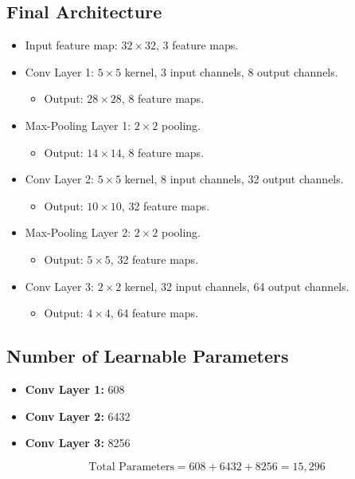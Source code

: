 \documentclass[a4paper,12pt]{article}
\begin{document}
\subsection*{Final Architecture}
\begin{itemize}
    \item Input feature map: \( 32 \times 32 \), 3 feature maps.
    \item Conv Layer 1: \( 5 \times 5 \) kernel, 3 input channels, 8 output channels.
        \begin{itemize}
            \item Output: \( 28 \times 28 \), 8 feature maps.
        \end{itemize}
    \item Max-Pooling Layer 1: \( 2 \times 2 \) pooling.
        \begin{itemize}
            \item Output: \( 14 \times 14 \), 8 feature maps.
        \end{itemize}
    \item Conv Layer 2: \( 5 \times 5 \) kernel, 8 input channels, 32 output channels.
        \begin{itemize}
            \item Output: \( 10 \times 10 \), 32 feature maps.
        \end{itemize}
    \item Max-Pooling Layer 2: \( 2 \times 2 \) pooling.
        \begin{itemize}
            \item Output: \( 5 \times 5 \), 32 feature maps.
        \end{itemize}
    \item Conv Layer 3: \( 2 \times 2 \) kernel, 32 input channels, 64 output channels.
        \begin{itemize}
            \item Output: \( 4 \times 4 \), 64 feature maps.
        \end{itemize}
\end{itemize}

\subsection*{Number of Learnable Parameters}
\begin{itemize}
    \item \textbf{Conv Layer 1:} 608 
    \item \textbf{Conv Layer 2:} 6432
    \item \textbf{Conv Layer 3:} 8256
\end{itemize}
\[
\text{Total Parameters} = 608 + 6432 + 8256 = 15,296
\]
\end{document}
